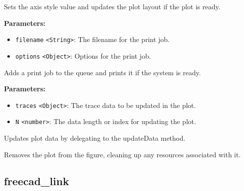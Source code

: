 \documentclass[12pt,a4paper]{article}
\begin{document}
\noindent Sets the axis style value and updates the plot layout if the plot is ready.

\vspace{5mm}
\noindent {}


\noindent \textbf{Parameters:}
\begin{itemize}
  \item \texttt{filename} \texttt{<String>}: The filename for the print job.
  \item \texttt{options} \texttt{<Object>}: Options for the print job.
\end{itemize}

\noindent Adds a print job to the queue and prints it if the system is ready.

\vspace{5mm}
\noindent {}


\noindent \textbf{Parameters:}
\begin{itemize}
  \item \texttt{traces} \texttt{<Object>}: The trace data to be updated in the plot.
  \item \texttt{N} \texttt{<number>}: The data length or index for updating the plot.
\end{itemize}

\noindent Updates plot data by delegating to the \textasciigrave{}updateData\textasciigrave{} method.

\vspace{5mm}
\noindent {}


\noindent Removes the plot from the figure, cleaning up any resources associated with it.


\subsection{freecad\_link}
\vspace{5mm}
\noindent {}
\end{document}
